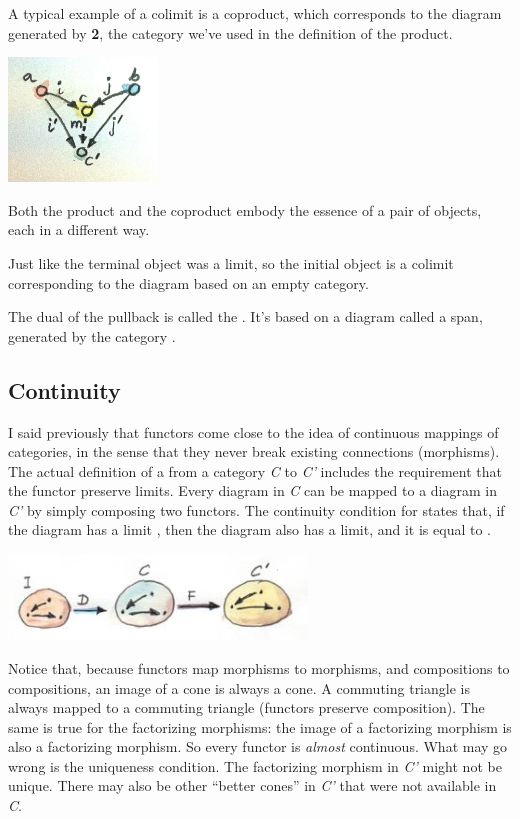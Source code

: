 A typical example of a colimit is a coproduct, which corresponds to the
diagram generated by \textbf{2}, the category we've used in the
definition of the product.

\includegraphics[width=1.56250in]{images/coproductranking.jpg}

Both the product and the coproduct embody the essence of a pair of
objects, each in a different way.

Just like the terminal object was a limit, so the initial object is a
colimit corresponding to the diagram based on an empty category.

The dual of the pullback is called the . It's based on a
diagram called a span, generated by the category
.

\subsection{Continuity}\label{continuity}

I said previously that functors come close to the idea of continuous
mappings of categories, in the sense that they never break existing
connections (morphisms). The actual definition of a   from a category \emph{C} to \emph{C'} includes the
requirement that the functor preserve limits. Every diagram 
in \emph{C} can be mapped to a diagram  in \emph{C'} by
simply composing two functors. The continuity condition for 
states that, if the diagram  has a limit , then
the diagram  also has a limit, and it is equal to
.

\includegraphics[width=3.12500in]{images/continuity.jpg}

Notice that, because functors map morphisms to morphisms, and
compositions to compositions, an image of a cone is always a cone. A
commuting triangle is always mapped to a commuting triangle (functors
preserve composition). The same is true for the factorizing morphisms:
the image of a factorizing morphism is also a factorizing morphism. So
every functor is \emph{almost} continuous. What may go wrong is the
uniqueness condition. The factorizing morphism in \emph{C'} might not be
unique. There may also be other ``better cones'' in \emph{C'} that were
not available in \emph{C}.

